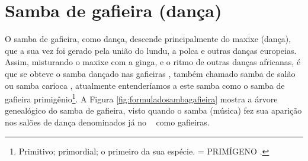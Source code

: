 \section{Samba de gafieira (dança)}
O samba de gafieira, como dança, descende principalmente do maxixe (dança),
que a sua vez foi gerado  pela união do  lundu, 
a polca e outras danças europeias.
Assim, misturando o maxixe com a ginga, e o ritmo de outras danças africanas, 
é que se obteve o samba dançado nas gafieiras \cite[pp. 139]{perna2002samba}, também chamado
samba de salão ou samba carioca \cite[pp. 50]{fornaciari1947aprender},
atualmente entenderíamos a este samba como o samba de gafieira primigênio\footnote{
Primitivo; primordial; o primeiro da sua espécie. = PRIMÍGENO \cite{priberamprimigenio}.
}. 
A Figura \ref{fig:formuladosambagafieira} mostra a árvore genealógico do samba de gafieira,
visto quando o samba (música) fez sua aparição nos salões de dança denominados já no \AnoLivro~ como gafieiras.
